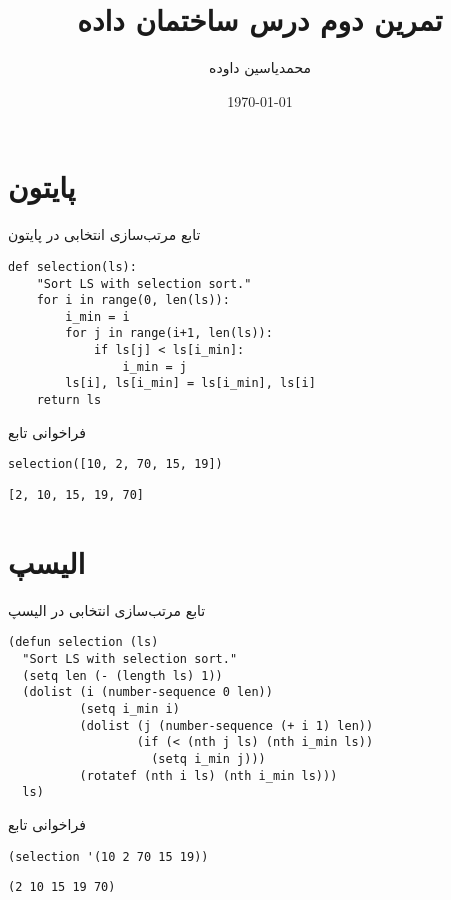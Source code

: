 \documentclass[a4paper]{article}
\author{محمدیاسین داوده}
\date{\today}
\title{تمرین دوم درس ساختمان داده}
\begin{document}
\maketitle

\section{پایتون}
\label{sec:orgada9229}

\begin{listing}[htbp]
\caption{تابع مرتب‌سازی انتخابی در پایتون}
\begin{verbatim}
def selection(ls):
    "Sort LS with selection sort."
    for i in range(0, len(ls)):
        i_min = i
        for j in range(i+1, len(ls)):
            if ls[j] < ls[i_min]:
                i_min = j
        ls[i], ls[i_min] = ls[i_min], ls[i]
    return ls
\end{verbatim}
\end{listing}

\begin{listing}[htbp]
\caption{فراخوانی تابع}
\begin{verbatim}
selection([10, 2, 70, 15, 19])
\end{verbatim}
\end{listing}

\begin{verbatim}
[2, 10, 15, 19, 70]
\end{verbatim}

\section{الیسپ}
\label{sec:org9352cb1}

\begin{listing}[htbp]
\caption{تابع مرتب‌سازی انتخابی در الیسپ}
\begin{verbatim}
(defun selection (ls)
  "Sort LS with selection sort."
  (setq len (- (length ls) 1))
  (dolist (i (number-sequence 0 len))
          (setq i_min i)
          (dolist (j (number-sequence (+ i 1) len))
                  (if (< (nth j ls) (nth i_min ls))
                    (setq i_min j)))
          (rotatef (nth i ls) (nth i_min ls)))
  ls)
\end{verbatim}
\end{listing}

\begin{listing}[htbp]
\caption{فراخوانی تابع}
\begin{verbatim}
(selection '(10 2 70 15 19))
\end{verbatim}
\end{listing}

\begin{verbatim}
(2 10 15 19 70)
\end{verbatim}
\end{document}
